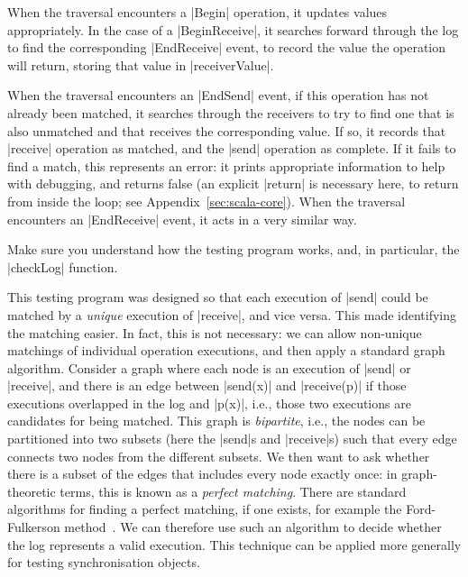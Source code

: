 When the traversal encounters a |Begin| operation, it updates values
appropriately.  In the case of a |BeginReceive|, it searches forward through
the log to find the corresponding |EndReceive| event, to record the value the
operation will return, storing that value in |receiverValue|.

When the traversal encounters an |EndSend| event, if this operation has not
already been matched, it searches through the receivers to try to find one
that is also unmatched and that receives the corresponding value.  If so, it
records that |receive| operation as matched, and the |send| operation as
complete.  If it fails to find a match, this represents an error: it prints
appropriate information to help with debugging, and returns false (an explicit
|return| is necessary here, to return from inside the loop; see
Appendix~\ref{sec:scala-core}).  When the traversal encounters an |EndReceive|
event, it acts in a very similar way.

\begin{instruction}
Make sure you understand how the testing program works, and, in particular,
the |checkLog| function.
\end{instruction}

This testing program was designed so that each execution of |send| could be
matched by a \emph{unique} execution of |receive|, and vice versa.  This made
identifying the matching easier.  In fact, this is not necessary: we can allow
non-unique matchings of individual operation executions, and then apply a
standard graph algorithm.  Consider a graph where each node is an execution of
|send| or |receive|, and there is an edge between |send(x)| and |receive(p)|
if those executions overlapped in the log and |p(x)|, i.e., those two
executions are candidates for being matched.  This graph is \emph{bipartite},
i.e., the nodes can be partitioned into two subsets (here the |send|s and
|receive|s) such that every edge connects two nodes from the different
subsets.  We then want to ask whether there is a subset of the edges that
includes every node exactly once: in graph-theoretic terms, this is known as a
\emph{perfect matching}.  There are standard algorithms for finding a perfect
matching, if one exists, for example the Ford-Fulkerson
method~\cite{ford-fulkerson, CLRS}.  We can therefore use such an algorithm to
decide whether the log represents a valid execution.  This technique can be
applied more generally for testing synchronisation objects.

